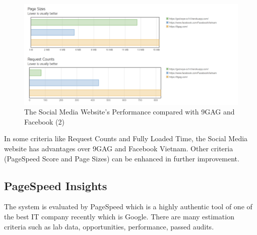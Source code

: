 \begin{center}
    \begin{figure}[H]
    \centering
    \includegraphics[width=1\columnwidth]{images/chap5/gtmetrix-graph-2.PNG}
    \caption{The Social Media Website's Performance compared with 9GAG and Facebook (2)}
    \end{figure}
\end{center}
\vspace{-1cm}
In some criteria like Request Counts and Fully Loaded Time, the Social Media website has advantages over 9GAG and Facebook Vietnam. Other criteria (PageSpeed Score and Page Sizes) can be enhanced in further improvement.

\subsection{PageSpeed Insights}
The system is evaluated by PageSpeed which is a highly authentic tool of one of the best IT company recently which is Google. There are many estimation criteria such as lab data, opportunities, performance, passed audits. 

